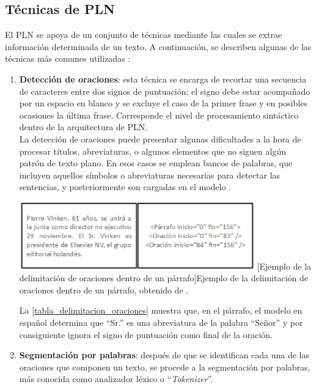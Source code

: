 \subsection{Técnicas de PLN}
El PLN se apoya de un conjunto de técnicas mediante las cuales se extrae información determinada de un texto. A continuación, se describen algunas de las técnicas más comunes utilizadas \cite{ref47}:

\begin{enumerate}
    \item \textbf{Detección de oraciones}: esta técnica se encarga de recortar una secuencia de caracteres entre dos signos de puntuación; el signo debe estar acompañado por un espacio en blanco y se excluye el caso de la primer frase y en posibles ocasiones la última frase. Corresponde el nivel de procesamiento sintáctico dentro de la arquitectura de PLN.\\
    
La detección de oraciones puede presentar algunas dificultades a la hora de procesar títulos, abreviaturas, o algunos elementos que no siguen algún patrón de texto plano. En esos casos se emplean bancos de palabras, que incluyen aquellos símbolos o abreviaturas necesarias para detectar las sentencias, y posteriormente son cargadas en el modelo \cite{ref47}.
\begin{center}
    \includegraphics[width=0.8\textwidth]{Images/Cap 2/Deteccion_Oraciones.png}
    [Ejemplo de la delimitación de oraciones dentro de un párrafo]{Ejemplo de la delimitación de oraciones dentro de un párrafo, obtenido de \cite{ref47}.}
    \label{tabla_delimitacion_oraciones}
\end{center}
La \autoref{tabla_delimitacion_oraciones} muestra que, en el párrafo, el modelo en español determina que “Sr.” es una abreviatura de la palabra “Señor” y por consiguiente ignora el signo de puntuación como final de la oración.

\item \textbf{Segmentación por palabras}: después de que se identifican cada una de las oraciones que componen un texto, se procede a la segmentación por palabras, más conocida como analizador léxico o “\textit{Tokenizer}”.\\


\end{enumerate}
